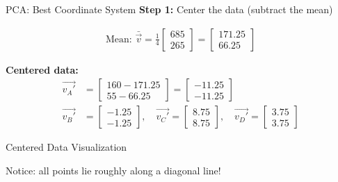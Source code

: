 \documentclass[aspectratio=169]{beamer}
\begin{document}
\begin{frame}{PCA: Best Coordinate System}
\textbf{Step 1:} Center the data (subtract the mean)

\begin{align}
\text{Mean: } \bar{\vec{v}} = \frac{1}{4}\begin{bmatrix} 685 \\ 265 \end{bmatrix} = \begin{bmatrix} 171.25 \\ 66.25 \end{bmatrix}
\end{align}

\textbf{Centered data:}
\begin{align}
\vec{v_A'} &= \begin{bmatrix} 160-171.25 \\ 55-66.25 \end{bmatrix} = \begin{bmatrix} -11.25 \\ -11.25 \end{bmatrix} \\
\vec{v_B'} &= \begin{bmatrix} -1.25 \\ -1.25 \end{bmatrix}, \quad 
\vec{v_C'} = \begin{bmatrix} 8.75 \\ 8.75 \end{bmatrix}, \quad 
\vec{v_D'} = \begin{bmatrix} 3.75 \\ 3.75 \end{bmatrix}
\end{align}
\end{frame}

\begin{frame}{Centered Data Visualization}
\begin{center}
\end{center}

Notice: all points lie roughly along a diagonal line!
\end{frame}
\end{document}
